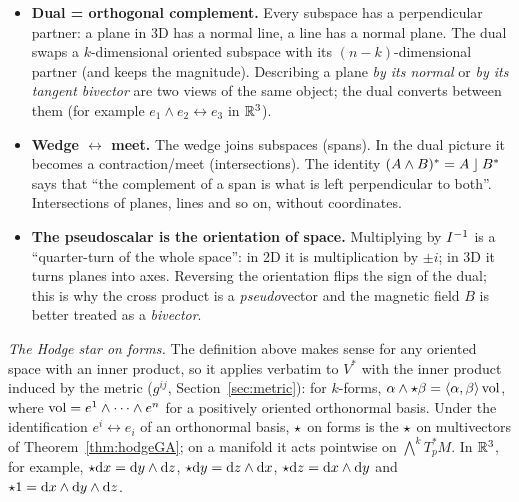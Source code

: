 \begin{intuition}
\begin{itemize}
  \item \textbf{Dual = orthogonal complement.} Every subspace has a perpendicular partner: a plane in $3$D has a normal line, a line has a normal plane. The dual swaps a $k$-dimensional oriented subspace with its $(n-k)$-dimensional partner (and keeps the magnitude).
  Describing a plane \emph{by its normal} or \emph{by its tangent bivector} are two views of the same object; the dual converts between them (for example $e_1\wedge e_2\leftrightarrow e_3$ in $\mathbb{R}^3$).
  \item \textbf{Wedge $\leftrightarrow$ meet.} The wedge joins subspaces (spans). In the dual picture it becomes a contraction/meet (intersections). The identity $(A\wedge B)^{\ast}=A\mathbin{\rfloor}B^{\ast}$ says that ``the complement of a span is what is left perpendicular to both''. Intersections of planes, lines and so on, without coordinates.
  \item \textbf{The pseudoscalar is the orientation of space.} Multiplying by $I^{-1}$ is a ``quarter-turn of the whole space'': in 2D it is multiplication by $\pm i$; in 3D it turns planes into axes. Reversing the orientation flips the sign of the dual; this is why the cross product is a \emph{pseudo}vector and the magnetic field $B$ is better treated as a \emph{bivector}.
\end{itemize}
\end{intuition}

\emph{The Hodge star on forms.} The definition above makes sense for any oriented space with an inner product, so it applies
verbatim to $V^*$ with the inner product induced by the metric ($g^{ij}$, Section~\ref{sec:metric}): for $k$-forms,
$\alpha\wedge\star\beta=\langle\alpha,\beta\rangle\,\mathrm{vol}$, where $\mathrm{vol}=e^1\wedge\cdots\wedge e^n$ for a positively oriented orthonormal
basis. Under the identification $e^i\leftrightarrow e_i$ of an orthonormal basis, $\star$ on forms is the $\star$ on multivectors
of Theorem~\ref{thm:hodgeGA}; on a manifold it acts pointwise on $\bigwedge^kT_p^*M$. In $\mathbb{R}^3$, for example, $\star\mathrm{d} x=\mathrm{d} y\wedge\mathrm{d} z$,
$\star\mathrm{d} y=\mathrm{d} z\wedge\mathrm{d} x$, $\star\mathrm{d} z=\mathrm{d} x\wedge\mathrm{d} y$ and $\star1=\mathrm{d} x\wedge\mathrm{d} y\wedge\mathrm{d} z$.
